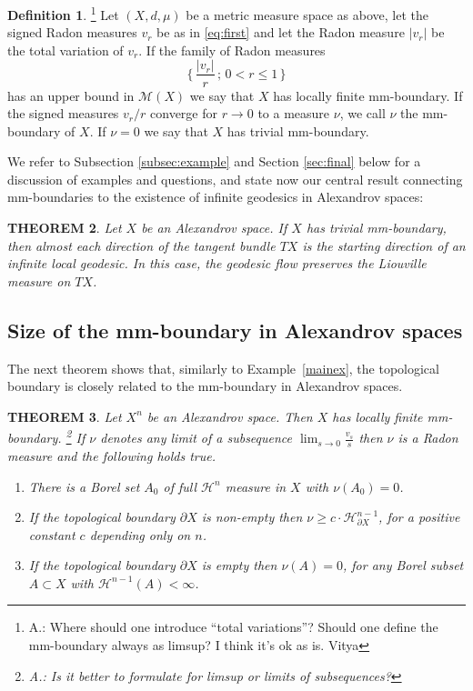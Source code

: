 \documentclass[12pt,leqno]{amsart}
\numberwithin{equation}{section}
\newtheorem{thm}{THEOREM}[section]
\theoremstyle{definition}
\newtheorem{defn}[thm]{Definition}%
\theoremstyle{remark}
\newcommand{\exref}[1]{Example~\ref{#1}}
\begin{document}
\begin{defn}  \footnote{A.:  Where should one introduce ``total variations''?  Should one define the mm-boundary always as limsup?{\color{red} I think it's ok as is. Vitya}}
Let $(X,d,\mu)$ be a metric measure space as above,  let  the signed Radon measures $v_r$ be as in \eqref{eq:first} and let  the Radon measure $|v_r|$ be the total variation of $v_r$.
If the  family of Radon measures
\[\{\, \frac {| v_r |}  {r } \,;\,  0<r\leq  1 \,\}\]
has an upper bound in $\mathcal M( X)$ we say that $X$ has   locally finite mm-boundary.
If the signed measures $v_r  /r$  converge for $r\to 0$ to a measure $\nu$, we call $\nu$ the mm-boundary of $X$.  If $\nu =0$ we say that $X$ has trivial mm-boundary.
\end{defn}


We refer to Subsection \ref{subsec:example}  and Section \ref{sec:final}  below for a discussion of  examples and questions, and
 state now our central  result connecting  mm-boundaries to the existence  of infinite geodesics in Alexandrov spaces:

 \begin{thm} \label{thmmain}
 Let $X$ be an Alexandrov space. If $X$ has trivial mm-boundary, then  almost each direction of the tangent
 bundle $TX$ is the starting direction of  an infinite local geodesic. In this case, the geodesic flow preserves the Liouville measure on $TX$.
 \end{thm}

\subsection{Size of the mm-boundary in Alexandrov spaces}
The next theorem shows that, similarly to \exref{mainex},  the topological boundary is closely related to the mm-boundary in Alexandrov spaces.

\begin{thm} \label{alexandrovthm}
Let $X^n$ be an Alexandrov space. Then $X$ has locally finite mm-boundary.  \footnote{ A.:  Is it better to formulate for limsup or limits of subsequences?}
If $\nu$ denotes any limit of a subsequence $\lim _{s\to 0} \frac {v_s}  {s}$ then $\nu$ is a Radon measure and
 the following holds true.
\begin{enumerate}
\item\label{full-measure-zero-nu}There is a Borel set $A_0$ of full $\mathcal H^n$ measure in $X$
with $\nu (A_0)=0$.
\item\label{bry-nu} If the topological boundary $\partial X$ is non-empty then $\nu \geq c \cdot \mathcal H^{n-1} _{\partial X}$,
for a positive constant $c$ depending only on $n$.
\item \label{n-1-nu} If the topological boundary $\partial X$ is empty then $\nu (A)=0$, for any Borel subset $A\subset X$ with  $\mathcal H^{n-1} (A)<\infty$.
\end{enumerate}
\end{thm}
\end{document}
